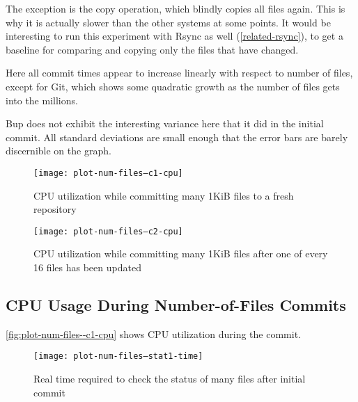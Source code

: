 The exception is the copy operation, which blindly copies all files again. This
is why it is actually slower than the other systems at some points. It would be
interesting to run this experiment with Rsync as well (\autoref{related-rsync}),
to get a baseline for comparing and copying only the files that have changed.

Here all commit times appear to increase linearly with respect to number of
files, except for Git, which shows some quadratic growth as the number of files
gets into the millions.

Bup does not exhibit the interesting variance here that it did in the initial
commit. All standard deviations are small enough that the error bars are barely
discernible on the graph.

%


\begin{figure}[p]
    \caption{CPU utilization while committing many 1KiB files to a fresh
    repository}
    \label{fig:plot-num-files--c1-cpu}
    \centering
    \texttt{[image: plot-num-files--c1-cpu]}
\end{figure}

\begin{figure}[p]
    \caption{CPU utilization while committing many 1KiB files after one of every
        \num{16} files has been updated}
    \label{fig:plot-num-files--c2-cpu}
    \centering
    \texttt{[image: plot-num-files--c2-cpu]}
\end{figure}

\cleardoublepage

\subsection{CPU Usage During Number-of-Files Commits}

\autoref{fig:plot-num-files--c1-cpu} shows CPU utilization during the
\gls{commit}.


%


\begin{figure}[p]
    \begin{leftfullpage}
        \caption{Real time required to check the status of many files after
        initial commit}
        \label{fig:plot-num-files--stat1-time}
        \centering

        \explainlogsubfig

        \texttt{[image: plot-num-files--stat1-time]}
    \end{leftfullpage}
\end{figure}

